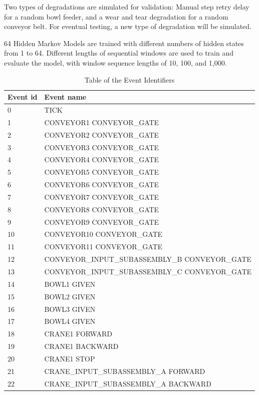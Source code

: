 \documentclass[journal]{IEEEtran}
\begin{document}
Two types of degradations are simulated for validation: Manual step retry delay for a random bowl feeder, and a wear and tear degradation for a random conveyor belt. For eventual testing, a new type of degradation will be simulated.

64 Hidden Markov Models are trained with different numbers of hidden states from 1 to 64. Different lengths of sequential windows are used to train and evaluate the model, with window sequence lengths of 10, 100, and 1,000.

\begin{table}[!t]
\caption{Table of the Event Identifiers}
\label{eventids}
\centering
\begin{tabular}{|p{5mm}|p{55mm}|}
\hline
Event id & Event name \\
\hline
\hline
0 & TICK \\
\hline
1 & CONVEYOR1 CONVEYOR\_GATE \\
\hline
2 & CONVEYOR2 CONVEYOR\_GATE \\
\hline
3 & CONVEYOR3 CONVEYOR\_GATE \\
\hline
4 & CONVEYOR4 CONVEYOR\_GATE \\
\hline
5 & CONVEYOR5 CONVEYOR\_GATE \\
\hline
6 & CONVEYOR6 CONVEYOR\_GATE \\
\hline
7 & CONVEYOR7 CONVEYOR\_GATE \\
\hline
8 & CONVEYOR8 CONVEYOR\_GATE \\
\hline
9 & CONVEYOR9 CONVEYOR\_GATE \\
\hline
10 & CONVEYOR10 CONVEYOR\_GATE \\
\hline
11 & CONVEYOR11 CONVEYOR\_GATE \\
\hline
12 & CONVEYOR\_INPUT\_SUBASSEMBLY\_B CONVEYOR\_GATE \\
\hline
13 & CONVEYOR\_INPUT\_SUBASSEMBLY\_C CONVEYOR\_GATE \\
\hline
14 & BOWL1 GIVEN \\
\hline
15 & BOWL2 GIVEN \\
\hline
16 & BOWL3 GIVEN \\
\hline
17 & BOWL4 GIVEN \\
\hline
18 & CRANE1 FORWARD \\
\hline
19 & CRANE1 BACKWARD \\
\hline
20 & CRANE1 STOP \\
\hline
21 & CRANE\_INPUT\_SUBASSEMBLY\_A FORWARD \\
\hline
22 & CRANE\_INPUT\_SUBASSEMBLY\_A BACKWARD \\

\end{tabular}
\end{table}
\end{document}
